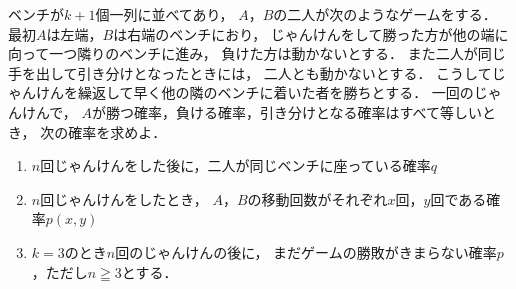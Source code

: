 \documentclass[../../main.tex]{subfiles}
\begin{document}
ベンチが$k+1$個一列に並べてあり，
$A$，$B$の二人が次のようなゲームをする．
最初$A$は左端，$B$は右端のベンチにおり，
じゃんけんをして勝った方が他の端に向って一つ隣りのベンチに進み，
負けた方は動かないとする．
また二人が同じ手を出して引き分けとなったときには，
二人とも動かないとする．
こうしてじゃんけんを繰返して早く他の隣のベンチに着いた者を勝ちとする．
一回のじゃんけんで，
$A$が勝つ確率，負ける確率，引き分けとなる確率はすべて等しいとき，
次の確率を求めよ．
\begin{enumerate}
  \item $n$回じゃんけんをした後に，二人が同じベンチに座っている確率$q$
  \item $n$回じゃんけんをしたとき，
    $A$，$B$の移動回数がそれぞれ$x$回，$y$回である確率$p(x,y)$
  \item $k=3$のとき$n$回のじゃんけんの後に，
    まだゲームの勝敗がきまらない確率$p$，ただし$n\geqq3$とする．
\end{enumerate}
\end{document}
